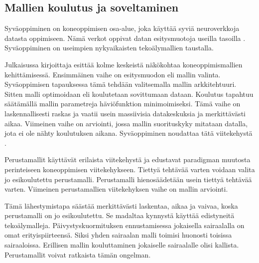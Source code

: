 \subsection*{Mallien koulutus ja soveltaminen}

Syväoppiminen on koneoppimisen osa-alue, joka käyttää syviä neuroverkkoja datasta oppimiseen. Nämä verkot oppivat datan esitysmuotoja useilla tasoilla \cite{lecun2015deep}. Syväoppiminen on useimpien nykyaikaisten tekoälymallien taustalla.

Julkaisussa \cite{Domingos2012Few} kirjoittaja esittää kolme keskeistä näkökohtaa koneoppimismallien kehittämisessä. Ensimmäinen vaihe on esitysmuodon eli mallin valinta. Syväoppimisen tapauksessa tämä tehdään valitsemalla mallin arkkitehtuuri. Sitten malli optimoidaan eli koulutetaan sovittumaan dataan. Koulutus tapahtuu säätämällä mallin parametreja häviöfunktion minimoimiseksi. Tämä vaihe on laskennallisesti raskas ja vaatii usein massiivisia datakeskuksia ja merkittävästi aikaa. \cite{bommasani2022opportunitiesrisksfoundationmodels} Viimeinen vaihe on arviointi, jossa mallin suorituskyky mitataan datalla, jota ei ole nähty koulutuksen aikana. Syväoppiminen noudattaa tätä viitekehystä \cite{lecun2015deep}.

Perustamallit käyttävät erilaista viitekehystä ja edustavat paradigman muutosta perinteiseen koneoppimisen viitekehykseen. Tiettyä tehtävää varten voidaan valita jo esikoulutettu perustamalli. Perustamalli hienosäädetään usein tiettyä tehtävää varten. Viimeinen perustamallien viitekehyksen vaihe on mallin arviointi. \cite{bommasani2022opportunitiesrisksfoundationmodels}

Tämä lähestymistapa säästää merkittävästi laskentaa, aikaa ja vaivaa, koska perustamalli on jo esikoulutettu. Se madaltaa kynnystä käyttää edistyneitä tekoälymalleja. Päivystyskuormituksen ennustamisessa jokaisella sairaalalla on omat erityispiirteensä. Siksi yhden sairaalan malli toimisi huonosti toisissa sairaaloissa. Erillisen mallin kouluttaminen jokaiselle sairaalalle olisi kallista. Perustamallit voivat ratkaista tämän ongelman.


